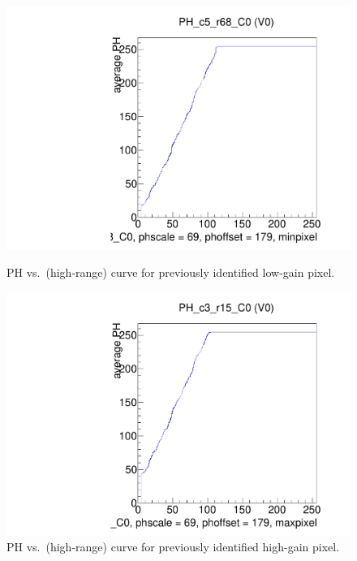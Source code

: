 \begin{figure}[!htp]
\centering
\begin{minipage}{0.45\textwidth}
  \includegraphics[width=1.0\textwidth]{figures/phopt_PH_c5_r68.pdf}
  \caption{PH vs.~(high-range)  \vcal curve for previously identified low-gain pixel.}
  \label{fig:phopt_PH_c5_r68}
\end{minipage}
\hspace{0.3cm}
\begin{minipage}{0.45\textwidth}
  \includegraphics[width=1.0\textwidth]{figures/phopt_PH_c3_r15.pdf}
  \caption{PH vs.~(high-range) \vcal curve for previously identified high-gain pixel.}
  \label{fig:phopt_PH_c3_r15}
\end{minipage}
\end{figure}


